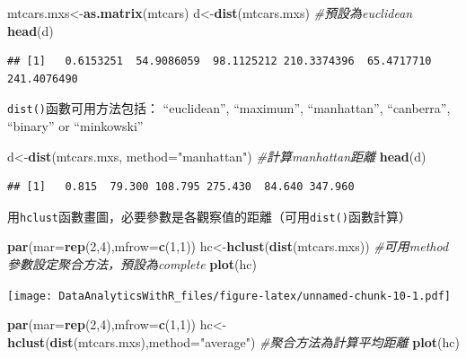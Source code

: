 \documentclass[
]{book}
\newenvironment{Shaded}{\begin{snugshade}}{\end{snugshade}}
\newcommand{\CommentTok}[1]{\textcolor[rgb]{0.56,0.35,0.01}{\textit{#1}}}
\newcommand{\DataTypeTok}[1]{\textcolor[rgb]{0.13,0.29,0.53}{#1}}
\newcommand{\DecValTok}[1]{\textcolor[rgb]{0.00,0.00,0.81}{#1}}
\newcommand{\KeywordTok}[1]{\textcolor[rgb]{0.13,0.29,0.53}{\textbf{#1}}}
\newcommand{\NormalTok}[1]{#1}
\newcommand{\StringTok}[1]{\textcolor[rgb]{0.31,0.60,0.02}{#1}}
\begin{document}
\begin{Shaded}
\begin{Highlighting}[]
\NormalTok{mtcars.mxs<-}\KeywordTok{as.matrix}\NormalTok{(mtcars)}
\NormalTok{d<-}\KeywordTok{dist}\NormalTok{(mtcars.mxs) }\CommentTok{#預設為euclidean}
\KeywordTok{head}\NormalTok{(d)}
\end{Highlighting}
\end{Shaded}

\begin{verbatim}
## [1]   0.6153251  54.9086059  98.1125212 210.3374396  65.4717710 241.4076490
\end{verbatim}

\texttt{dist()}函數可用方法包括：
``euclidean'', ``maximum'', ``manhattan'', ``canberra'', ``binary'' or ``minkowski''

\begin{Shaded}
\begin{Highlighting}[]
\NormalTok{d<-}\KeywordTok{dist}\NormalTok{(mtcars.mxs, }\DataTypeTok{method=}\StringTok{"manhattan"}\NormalTok{) }\CommentTok{#計算manhattan距離}
\KeywordTok{head}\NormalTok{(d)}
\end{Highlighting}
\end{Shaded}

\begin{verbatim}
## [1]   0.815  79.300 108.795 275.430  84.640 347.960
\end{verbatim}

用\texttt{hclust}函數畫圖，必要參數是各觀察值的距離（可用\texttt{dist()}函數計算）

\begin{Shaded}
\begin{Highlighting}[]
\KeywordTok{par}\NormalTok{(}\DataTypeTok{mar=}\KeywordTok{rep}\NormalTok{(}\DecValTok{2}\NormalTok{,}\DecValTok{4}\NormalTok{),}\DataTypeTok{mfrow=}\KeywordTok{c}\NormalTok{(}\DecValTok{1}\NormalTok{,}\DecValTok{1}\NormalTok{))}
\NormalTok{hc<-}\KeywordTok{hclust}\NormalTok{(}\KeywordTok{dist}\NormalTok{(mtcars.mxs)) }\CommentTok{#可用method參數設定聚合方法，預設為complete}
\KeywordTok{plot}\NormalTok{(hc)}
\end{Highlighting}
\end{Shaded}

\texttt{[image: DataAnalyticsWithR\_files/figure-latex/unnamed-chunk-10-1.pdf]}

\begin{Shaded}
\begin{Highlighting}[]
\KeywordTok{par}\NormalTok{(}\DataTypeTok{mar=}\KeywordTok{rep}\NormalTok{(}\DecValTok{2}\NormalTok{,}\DecValTok{4}\NormalTok{),}\DataTypeTok{mfrow=}\KeywordTok{c}\NormalTok{(}\DecValTok{1}\NormalTok{,}\DecValTok{1}\NormalTok{))}
\NormalTok{hc<-}\KeywordTok{hclust}\NormalTok{(}\KeywordTok{dist}\NormalTok{(mtcars.mxs),}\DataTypeTok{method=}\StringTok{"average"}\NormalTok{) }\CommentTok{#聚合方法為計算平均距離}
\KeywordTok{plot}\NormalTok{(hc)}
\end{Highlighting}
\end{Shaded}
\end{document}
